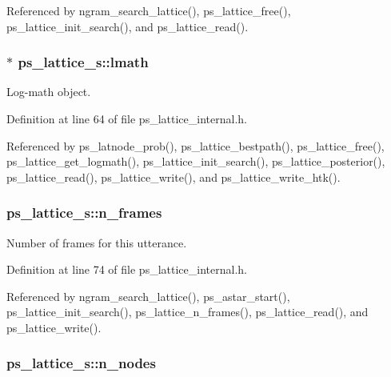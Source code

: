 \-Referenced by ngram\-\_\-search\-\_\-lattice(), ps\-\_\-lattice\-\_\-free(), ps\-\_\-lattice\-\_\-init\-\_\-search(), and ps\-\_\-lattice\-\_\-read().

\subsubsection[{lmath}]{$\ast$ {\bf ps\-\_\-lattice\-\_\-s\-::lmath}}\label{structps__lattice__s_a28f4ff5039e0961d57331d2605801010}


\-Log-\/math object. 



\-Definition at line 64 of file ps\-\_\-lattice\-\_\-internal.\-h.



\-Referenced by ps\-\_\-latnode\-\_\-prob(), ps\-\_\-lattice\-\_\-bestpath(), ps\-\_\-lattice\-\_\-free(), ps\-\_\-lattice\-\_\-get\-\_\-logmath(), ps\-\_\-lattice\-\_\-init\-\_\-search(), ps\-\_\-lattice\-\_\-posterior(), ps\-\_\-lattice\-\_\-read(), ps\-\_\-lattice\-\_\-write(), and ps\-\_\-lattice\-\_\-write\-\_\-htk().

\subsubsection[{n\-\_\-frames}]{ {\bf ps\-\_\-lattice\-\_\-s\-::n\-\_\-frames}}\label{structps__lattice__s_a3a997dc60d28b84d5bfc01f9ce25a891}


\-Number of frames for this utterance. 



\-Definition at line 74 of file ps\-\_\-lattice\-\_\-internal.\-h.



\-Referenced by ngram\-\_\-search\-\_\-lattice(), ps\-\_\-astar\-\_\-start(), ps\-\_\-lattice\-\_\-init\-\_\-search(), ps\-\_\-lattice\-\_\-n\-\_\-frames(), ps\-\_\-lattice\-\_\-read(), and ps\-\_\-lattice\-\_\-write().

\subsubsection[{n\-\_\-nodes}]{ {\bf ps\-\_\-lattice\-\_\-s\-::n\-\_\-nodes}}\label{structps__lattice__s_ab3690a8d16e3fa8a3b0dd3aa8277b653}


